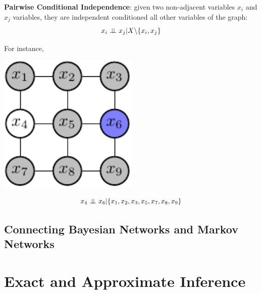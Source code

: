 \begin{corollary}
\textbf{Pairwise Conditional Independence}:
  given two non-adjacent variables $x_i$ and $x_j$ variables, they are independent conditioned all other variables of the graph:
 \begin{equation*}
  x_i \perp\!\!\!\perp x_j | X \backslash \{x_i,x_j\}
 \end{equation*}
\end{corollary}
For instance,  \newline\newline 
\begin{minipage}[c]{0.5\textwidth}   
	\centering
	\includegraphics[width=0.5\textwidth]{./Figures/markov_net_2.pdf}
\end{minipage}
\begin{minipage}[c]{0.4\textwidth}
   \begin{equation*}
    x_4 \perp\!\!\!\perp x_6 |\{x_1,x_2,x_3,x_5,x_7,x_8,x_9\}
   \end{equation*}
\end{minipage}


\subsection{Connecting Bayesian Networks and Markov Networks}






\section{Exact and Approximate Inference}

